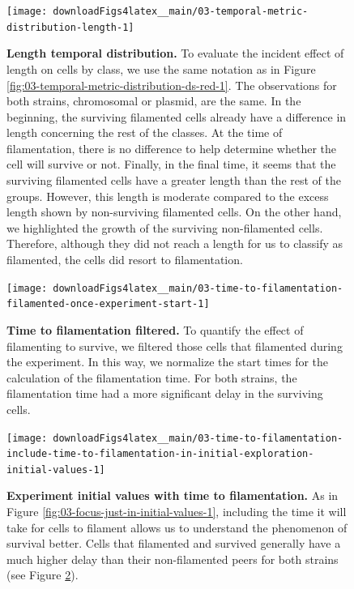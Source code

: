 \documentclass[a4paper, nobind]{templates/ociamthesis}
\begin{document}
\begin{figure}[H]
\texttt{[image: downloadFigs4latex\_\_main/03-temporal-metric-distribution-length-1]} \caption[Length temporal distribution.]{\textbf{Length temporal distribution.} To evaluate the incident effect of length on cells by class, we use the same notation as in Figure \ref{fig:03-temporal-metric-distribution-ds-red-1}. The observations for both strains, chromosomal or plasmid, are the same. In the beginning, the surviving filamented cells already have a difference in length concerning the rest of the classes. At the time of filamentation, there is no difference to help determine whether the cell will survive or not. Finally, in the final time, it seems that the surviving filamented cells have a greater length than the rest of the groups. However, this length is moderate compared to the excess length shown by non-surviving filamented cells. On the other hand, we highlighted the growth of the surviving non-filamented cells. Therefore, although they did not reach a length for us to classify as filamented, the cells did resort to filamentation.}\label{fig:03-temporal-metric-distribution-length-1}
\end{figure}





\begin{figure}[H]
\texttt{[image: downloadFigs4latex\_\_main/03-time-to-filamentation-filamented-once-experiment-start-1]} \caption[Time to filamentation filtered.]{\textbf{Time to filamentation filtered.} To quantify the effect of filamenting to survive, we filtered those cells that filamented during the experiment. In this way, we normalize the start times for the calculation of the filamentation time. For both strains, the filamentation time had a more significant delay in the surviving cells.}\label{fig:03-time-to-filamentation-filamented-once-experiment-start-1}
\end{figure}





\begin{figure}[H]
\texttt{[image: downloadFigs4latex\_\_main/03-time-to-filamentation-include-time-to-filamentation-in-initial-exploration-initial-values-1]} \caption[Experiment initial values with time to filamentation.]{\textbf{Experiment initial values with time to filamentation.} As in Figure \ref{fig:03-focus-just-in-initial-values-1}, including the time it will take for cells to filament allows us to understand the phenomenon of survival better. Cells that filamented and survived generally have a much higher delay than their non-filamented peers for both strains (see Figure \ref{fig:03-time-to-filamentation-filamented-once-experiment-start-1}).}\label{fig:03-time-to-filamentation-include-time-to-filamentation-in-initial-exploration-initial-values-1}
\end{figure}
\end{document}
